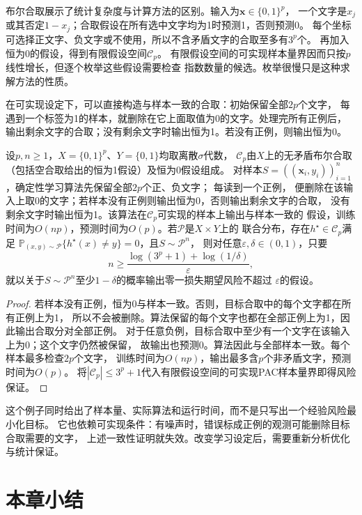 布尔合取展示了统计复杂度与计算方法的区别。输入为$\bm x\in\{0,1\}^p$，
一个文字是$x_j$或其否定$1-x_j$；合取假设在所有选中文字均为1时预测1，否则预测0。
每个坐标可选择正文字、负文字或不使用，所以不含矛盾文字的合取至多有$3^p$个。
再加入恒为0的假设，得到有限假设空间$\mathcal C_p$。
有限假设空间的可实现样本量界因而只按$p$线性增长，但逐个枚举这些假设需要检查
指数数量的候选。枚举很慢只是这种求解方法的性质。

在可实现设定下，可以直接构造与样本一致的合取：初始保留全部$2p$个文字，
每遇到一个标签为1的样本，就删除在它上面取值为0的文字。处理完所有正例后，
输出剩余文字的合取；没有剩余文字时输出恒为1。若没有正例，则输出恒为0。

\begin{theorem}[布尔合取的高效可实现学习]
\label{thm:efficient-conjunction-learning}
设$p,n\geq1$，$X=\{0,1\}^p$、$Y=\{0,1\}$均取离散$\sigma$代数，
$\mathcal C_p$由$X$上的无矛盾布尔合取（包括空合取给出的恒为1假设）及恒为0假设组成。
对样本$S=((\bm x_i,y_i))_{i=1}^n$，确定性学习算法先保留全部$2p$个正、负文字；
每读到一个正例，
便删除在该输入上取0的文字；若样本没有正例则输出恒为0，否则输出剩余文字的合取，
没有剩余文字时输出恒为1。该算法在$\mathcal C_p$可实现的样本上输出与样本一致的
假设，训练时间为$O(np)$，预测时间为$O(p)$。若$\mathcal P$是$X\times Y$上的
联合分布，存在$h^\star\in\mathcal C_p$满足
$\mathbb P_{(x,y)\sim\mathcal P}\{h^\star(x)\neq y\}=0$，且$S\sim\mathcal P^n$，
则对任意$\varepsilon,\delta\in(0,1)$，只要
\[
 n\geq\frac{\log(3^p+1)+\log(1/\delta)}{\varepsilon},
\]
就以关于$S\sim\mathcal P^n$至少$1-\delta$的概率输出零一损失期望风险不超过
$\varepsilon$的假设。
\end{theorem}

\begin{proof}
若样本没有正例，恒为0与样本一致。否则，目标合取中的每个文字都在所有正例上为1，
所以不会被删除。算法保留的每个文字也都在全部正例上为1，因此输出合取分对全部正例。
对于任意负例，目标合取中至少有一个文字在该输入上为0；这个文字仍然被保留，
故输出也预测0。算法因此与全部样本一致。每个样本最多检查$2p$个文字，
训练时间为$O(np)$，输出最多含$p$个非矛盾文字，预测时间为$O(p)$。
将$|\mathcal C_p|\leq3^p+1$代入有限假设空间的可实现PAC样本量界即得风险保证。
\end{proof}

这个例子同时给出了样本量、实际算法和运行时间，而不是只写出一个经验风险最小化目标。
它也依赖可实现条件：有噪声时，错误标成正例的观测可能删除目标合取需要的文字，
上述一致性证明就失效。改变学习设定后，需要重新分析优化与统计保证。

\section{本章小结}
\label{sec:binary-learning-summary}

